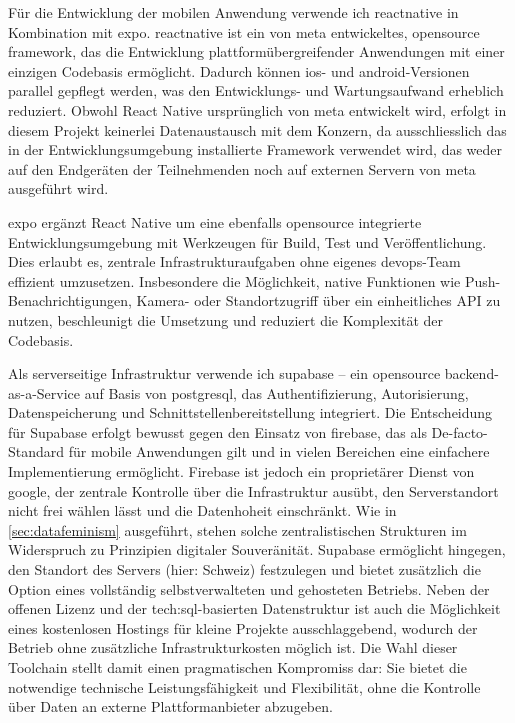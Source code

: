 Für die Entwicklung der mobilen Anwendung verwende ich \gls{reactnative} in Kombination mit \gls{expo}. \gls{reactnative} ist ein von \gls{meta} entwickeltes, \gls{opensource} \gls{framework}, das die Entwicklung plattformübergreifender Anwendungen mit einer einzigen Codebasis ermöglicht. Dadurch können \gls{ios}- und \gls{android}-Versionen parallel gepflegt werden, was den Entwicklungs- und Wartungsaufwand erheblich reduziert. Obwohl React Native ursprünglich von \gls{meta} entwickelt wird, erfolgt in diesem Projekt keinerlei Datenaustausch mit dem Konzern, da ausschliesslich das in der Entwicklungsumgebung installierte Framework verwendet wird, das weder auf den Endgeräten der Teilnehmenden noch auf externen Servern von \gls{meta} ausgeführt wird.

\gls{expo} ergänzt React Native um eine ebenfalls \gls{opensource} integrierte Entwicklungsumgebung mit Werkzeugen für Build, Test und Veröffentlichung. Dies erlaubt es, zentrale Infrastrukturaufgaben ohne eigenes \gls{devops}-Team effizient umzusetzen. Insbesondere die Möglichkeit, native Funktionen wie Push-Benachrichtigungen, Kamera- oder Standortzugriff über ein einheitliches API zu nutzen, beschleunigt die Umsetzung und reduziert die Komplexität der Codebasis.

Als serverseitige Infrastruktur verwende ich \gls{supabase} -- ein \gls{opensource} \gls{backend}-as-a-Service auf Basis von \gls{postgresql}, das Authentifizierung, Autorisierung, Datenspeicherung und Schnittstellenbereitstellung integriert. Die Entscheidung für Supabase erfolgt bewusst gegen den Einsatz von \gls{firebase}, das als De-facto-Standard für mobile Anwendungen gilt und in vielen Bereichen eine einfachere Implementierung ermöglicht. Firebase ist jedoch ein proprietärer Dienst von \gls{google}, der zentrale Kontrolle über die Infrastruktur ausübt, den Serverstandort nicht frei wählen lässt und die Datenhoheit einschränkt. Wie in \cref{sec:datafeminism} ausgeführt, stehen solche zentralistischen Strukturen im Widerspruch zu Prinzipien digitaler Souveränität. Supabase ermöglicht hingegen, den Standort des Servers (hier: Schweiz) festzulegen und bietet zusätzlich die Option eines vollständig selbstverwalteten und gehosteten Betriebs. Neben der offenen Lizenz und der \gls{tech:sql}-basierten Datenstruktur ist auch die Möglichkeit eines kostenlosen Hostings für kleine Projekte ausschlaggebend, wodurch der Betrieb ohne zusätzliche Infrastrukturkosten möglich ist. Die Wahl dieser Toolchain stellt damit einen pragmatischen Kompromiss dar: Sie bietet die notwendige technische Leistungsfähigkeit und Flexibilität, ohne die Kontrolle über Daten an externe Plattformanbieter abzugeben.

